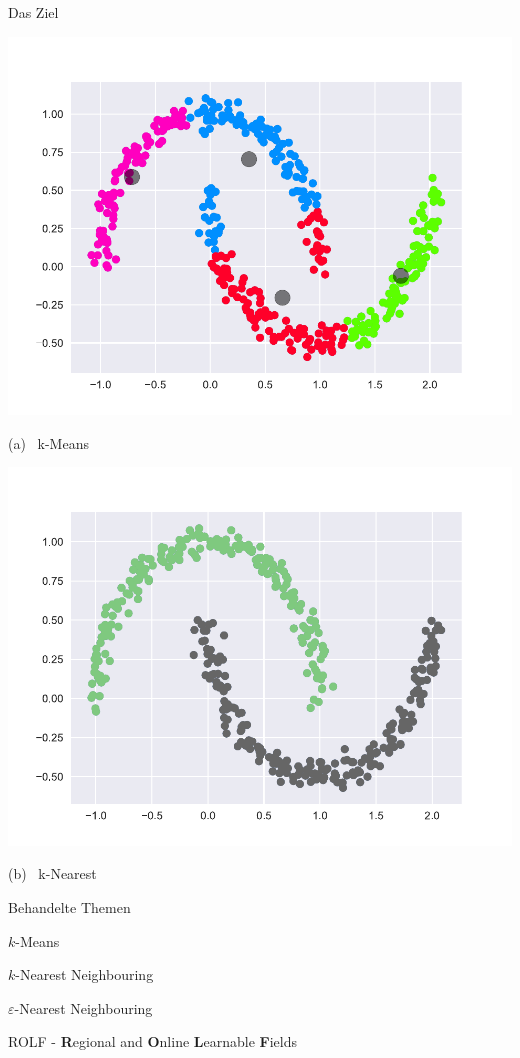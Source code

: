 \documentclass{beamer}
\begin{document}
    \begin{slide}{Das Ziel}
        \begin{minipage}[t]{0.49\linewidth}
            \centering
            \includegraphics[width=\linewidth]{Data/4-km-moon.pdf}
            {\centering (a) ~k-Means\par}
        \end{minipage}
        \begin{minipage}[t]{0.49\linewidth}
            \centering\includegraphics[width=\linewidth]{Data/42-knn-moon.pdf}
            {\centering (b) ~k-Nearest\par}
        \end{minipage}
    \end{slide}


    \begin{slide}{Behandelte Themen}
        \begin{bulletpoints}
            \pause\item \(k\)-Means
            \pause\item \(k\)-Nearest Neighbouring
            \pause\item \(\varepsilon\)-Nearest Neighbouring
            \pause\item ROLF - \textbf{R}egional and \textbf{O}nline \textbf{L}earnable \textbf{F}ields
        \end{bulletpoints}
    \end{slide}
\end{document}

